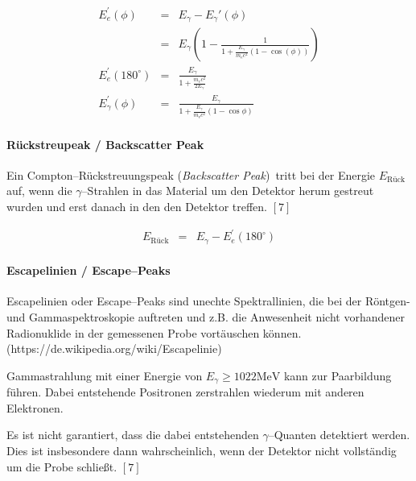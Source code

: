 \documentclass[12pt,a4paper]{scrartcl}
\numberwithin{equation}{section} %
\newcommand{\pu}[1]{\ensuremath{\mathrm{#1}}}
\renewcommand{\[}{} %
\renewcommand{\]}{\noindent} %
\begin{document}
\[
\begin{eqnarray}
    E_e^\prime(\phi)
        &=& E_{\gamma} - E_{\gamma}'(\phi) \\
        &=& E_{\gamma}
            \left(
                1-
                \frac{1}{1+\frac{E_{\gamma}}{m_\mathrm ec^2}
                    (1-\cos(\phi))}
            \right) \label{Compton--Kontinuum} \\
    E_e^\prime(180^\circ) &=& \frac{E_\gamma}{1+\frac{m_ec^2}{2E_\gamma}}
        \label{Compton--Kante} \\
    E_{\gamma}^\prime(\phi)
        &=& \frac{E_{\gamma}}{1+\frac{E_{\gamma}}{m_\mathrm ec^2}
            (1-\cos\phi)} \label{Klein--Nishina}
\end{eqnarray}
\]

\hypertarget{ruxfcckstreupeak-backscatter-peak}{%
\paragraph{Rückstreupeak / Backscatter
Peak}\label{ruxfcckstreupeak-backscatter-peak}}

Ein Compton--Rückstreuungspeak (\emph{Backscatter Peak})~tritt bei der
Energie \(E_\mathrm{Rück}\) auf, wenn die \(\gamma\)--Strahlen in das
Material um den Detektor herum gestreut wurden und erst danach in den
den Detektor treffen. \([7]\)

\[
\begin{eqnarray}
    E_\mathrm{Rück} &=& E_\gamma - E_e^\prime(180^\circ)
\end{eqnarray}
\]

\hypertarget{escapelinien-escapepeaks}{%
\paragraph{Escapelinien /
Escape--Peaks}\label{escapelinien-escapepeaks}}

Escapelinien oder Escape--Peaks sind unechte Spektrallinien, die bei der
Röntgen- und Gammaspektroskopie auftreten und z.B. die Anwesenheit nicht
vorhandener Radionuklide in der gemessenen Probe vortäuschen können.
(https://de.wikipedia.org/wiki/Escapelinie)

Gammastrahlung mit einer Energie von \(E_\gamma\ge\pu{1022MeV}\) kann
zur Paarbildung führen. Dabei entstehende Positronen zerstrahlen
wiederum mit anderen Elektronen.

Es ist nicht garantiert, dass die dabei entstehenden \(\gamma\)--Quanten
detektiert werden. Dies ist insbesondere dann wahrscheinlich, wenn der
Detektor nicht vollständig um die Probe schließt. \([7]\)
\end{document}
